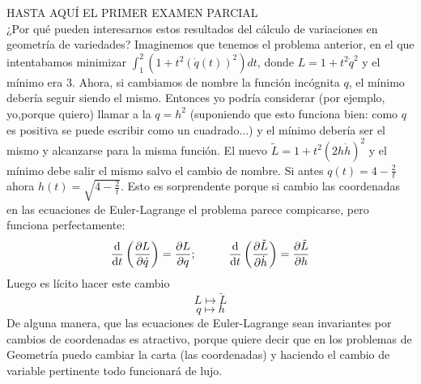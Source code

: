 \documentclass[palatino, bibnumbers]{apuntes}
\begin{document}
HASTA AQUÍ EL PRIMER EXAMEN PARCIAL\\
¿Por qué pueden interesarnos estos resultados del cálculo de variaciones en geometría de variedades? Imaginemos que tenemos el problema anterior, en el que intentabamos minimizar $\int_{1}^{2}(1+t^2(\dot{q}(t))^2)dt$, donde $L=1+t^2\dot{q}^2$ y el mínimo era 3.
Ahora, si cambiamos de nombre la función incógnita $q$, el mínimo debería seguir siendo el mismo. Entonces yo podría considerar (por ejemplo, yo,porque quiero) llamar a la $q=h^2$  (suponiendo que esto funciona bien: como $q$ es positiva se puede escribir como un cuadrado...) y el mínimo debería ser el mismo y alcanzarse para la misma función. El nuevo $\tilde{L}=1+t^2(2h\dot{h})^2$ y el mínimo debe salir el mismo salvo el cambio de nombre. Si antes $q(t)=4-\frac{2}{t}$ ahora $h(t)=\sqrt{4-\frac{2}{t}}$. Esto es sorprendente porque si cambio las coordenadas en las ecuaciones de Euler-Lagrange el problema parece compicarse, pero funciona perfectamente:
$$\dv{t}\left(\pdv{L}{\dot{q}}\right)=\pdv{L}{q};\hspace*{1cm}\dv{t}\left(\pdv{\tilde{L}}{\dot{h}}\right)=\pdv{\tilde{L}}{h}$$
Luego es lícito hacer este cambio 
$$L\longmapsto\tilde{L}$$
$$q\longmapsto h$$
 De alguna manera, que las ecuaciones de Euler-Lagrange sean invariantes por cambios de coordenadas es atractivo, porque quiere decir que en los problemas de Geometría puedo cambiar la carta (las coordenadas) y haciendo el cambio de variable pertinente todo funcionará de lujo.
\end{document}
